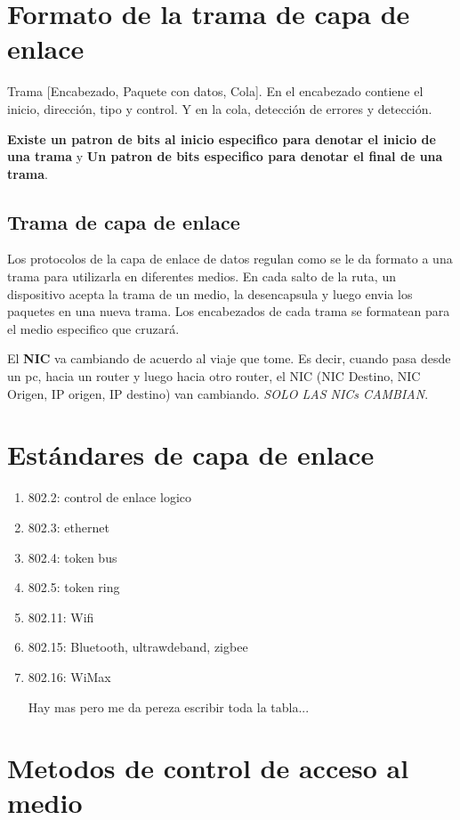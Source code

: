 \section{Formato de la trama de capa de enlace}

Trama [Encabezado, Paquete con datos, Cola]. En el encabezado contiene el inicio, dirección, tipo y control. Y en la cola, detección de errores y detección.

\textbf{Existe un patron de bits al inicio especifico para denotar el inicio de una trama} y \textbf{Un patron de bits especifico para denotar el final de una trama}.

\subsection{Trama de capa de enlace}
Los protocolos de la capa de enlace de datos regulan como se le da formato a una trama para utilizarla en diferentes medios.
En cada salto de la ruta, un dispositivo acepta la trama de un medio, la desencapsula y luego envia los paquetes en una nueva trama.
Los encabezados de cada trama se formatean para el medio especifico que cruzará.

El \textbf{NIC} va cambiando de acuerdo al viaje que tome. Es decir, cuando pasa desde un pc, hacia un router y luego hacia otro router, el NIC (NIC Destino, NIC Origen, IP origen, IP destino) van cambiando. \textit{SOLO LAS NICs CAMBIAN}.

\section{Estándares de capa de enlace}
\begin{enumerate}
\item 802.2: control de enlace logico
\item 802.3: ethernet
\item 802.4: token bus
\item 802.5: token ring
\item 802.11: Wifi
\item 802.15: Bluetooth, ultrawdeband, zigbee
\item 802.16: WiMax

Hay mas pero me da pereza escribir toda la tabla...
\end{enumerate}

\section{Metodos de control de acceso al medio}
